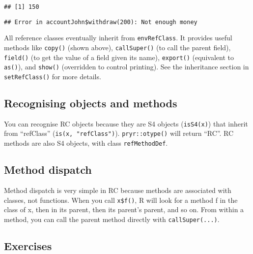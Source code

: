 \begin{verbatim}
## [1] 150
\end{verbatim}

\begin{Shaded}
\begin{Highlighting}[]
\OperatorTok{$}\NormalTok{(}\NormalTok{)}
\end{Highlighting}
\end{Shaded}

\begin{verbatim}
## Error in accountJohn$withdraw(200): Not enough money
\end{verbatim}

All reference classes eventually inherit from \texttt{envRefClass}. It
provides useful methods like \texttt{copy()} (shown above),
\texttt{callSuper()} (to call the parent field), \texttt{field()} (to
get the value of a field given its name), \texttt{export()} (equivalent
to \texttt{as()}), and \texttt{show()} (overridden to control printing).
See the inheritance section in \texttt{setRefClass()} for more details.

\hypertarget{recognising-objects-and-methods}{%
\subsection{Recognising objects and
methods}\label{recognising-objects-and-methods}}

You can recognise RC objects because they are S4 objects
(\texttt{isS4(x)}) that inherit from ``refClass''
(\texttt{is(x,\ "refClass")}). \texttt{pryr::otype()} will return
``RC''. RC methods are also S4 objects, with class
\texttt{refMethodDef}.

\hypertarget{method-dispatch-2}{%
\subsection{Method dispatch}\label{method-dispatch-2}}

Method dispatch is very simple in RC because methods are associated with
classes, not functions. When you call \texttt{x\$f()}, R will look for a
method f in the class of x, then in its parent, then its parent's
parent, and so on. From within a method, you can call the parent method
directly with \texttt{callSuper(...)}. 

\hypertarget{exercises-2}{%
\subsection{Exercises}\label{exercises-2}}

